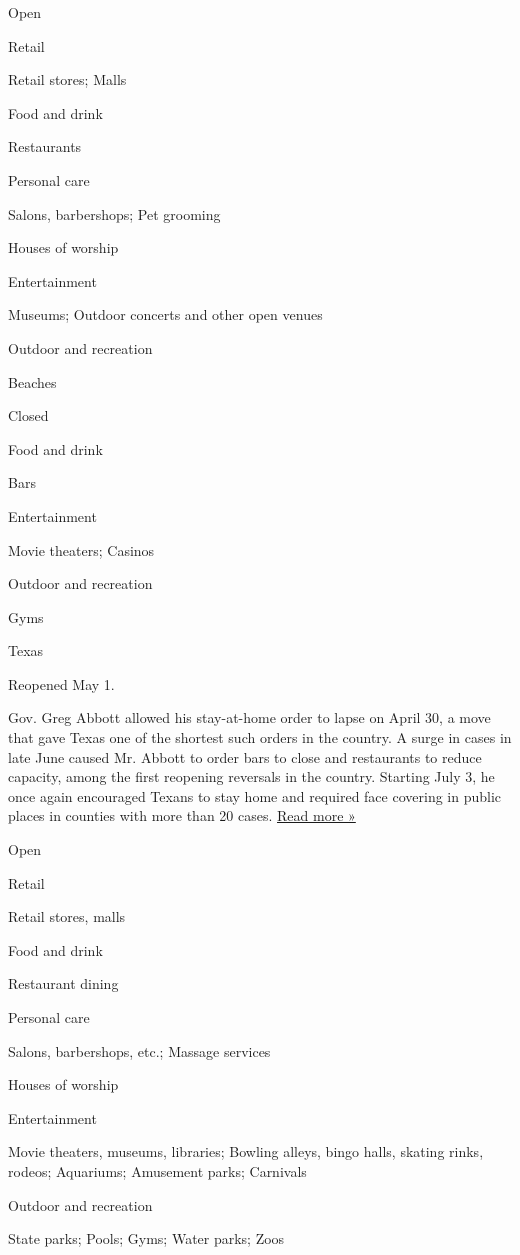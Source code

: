 Open

Retail

Retail stores; Malls

Food and drink

Restaurants

Personal care

Salons, barbershops; Pet grooming

Houses of worship

Entertainment

Museums; Outdoor concerts and other open venues

Outdoor and recreation

Beaches

Closed

Food and drink

Bars

Entertainment

Movie theaters; Casinos

Outdoor and recreation

Gyms

Texas

Reopened May 1.

Gov. Greg Abbott allowed his stay-at-home order to lapse on April 30, a
move that gave Texas one of the shortest such orders in the country. A
surge in cases in late June caused Mr. Abbott to order bars to close and
restaurants to reduce capacity, among the first reopening reversals in
the country. Starting July 3, he once again encouraged Texans to stay
home and required face covering in public places in counties with more
than 20 cases.
\href{https://www.texastribune.org/2020/06/26/texas-bars-restaurants-coronavirus-greg-abbott/}{Read
more »}

Open

Retail

Retail stores, malls

Food and drink

Restaurant dining

Personal care

Salons, barbershops, etc.; Massage services

Houses of worship

Entertainment

Movie theaters, museums, libraries; Bowling alleys, bingo halls, skating
rinks, rodeos; Aquariums; Amusement parks; Carnivals

Outdoor and recreation

State parks; Pools; Gyms; Water parks; Zoos

